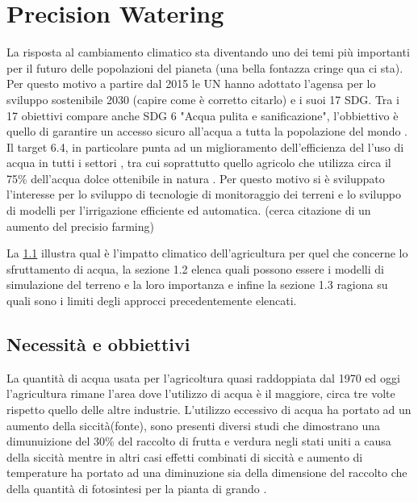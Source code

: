 \documentclass[12pt,a4paper,openright,twoside]{book}
\begin{document}
\chapter{Precision Watering}
%
%
La risposta al cambiamento climatico sta diventando uno dei temi più importanti per il futuro delle popolazioni del pianeta (una bella fontazza cringe qua ci sta). Per questo motivo a partire dal 2015 le \ac{UN} hanno adottato l'agensa per lo sviluppo sostenibile 2030 (capire come è corretto citarlo) e i suoi 17 \ac{SDG}. 
%
Tra i 17 obiettivi compare anche \ac{SDG} 6 "Acqua pulita e sanificazione", l'obbiettivo è quello di garantire un accesso sicuro all'acqua a tutta la popolazione del mondo \cite{SDG-6} . Il target 6.4, in particolare punta ad un miglioramento dell'efficienza del l'uso di acqua in tutti i settori \cite{SDG-6-4-1, UN-Water-Water-use-eff-21} , tra cui soprattutto quello agricolo che utilizza circa il 75\% dell'acqua dolce ottenibile in natura \cite{Wallace2000}. 
%
Per questo motivo si è sviluppato l'interesse per lo sviluppo di tecnologie di monitoraggio dei terreni e lo sviluppo di modelli per l'irrigazione efficiente ed automatica. (cerca citazione di un aumento del precisio farming)

La \cref{necessità e obbiettivi} illustra qual è l'impatto climatico dell'agricultura per quel che concerne lo sfruttamento di acqua, la sezione 1.2 elenca quali possono essere i modelli di simulazione del terreno e la loro importanza e infine la sezione 1.3 ragiona su quali sono i limiti degli approcci precedentemente elencati.

\section{Necessità e obbiettivi}
\label{necessità e obbiettivi}

La quantità di acqua usata per l'agricoltura quasi raddoppiata dal 1970 ed oggi l'agricultura rimane l'area dove l'utilizzo di acqua è il maggiore, circa tre volte rispetto quello delle altre industrie. \cite{FAO-acquastat-2020}
L'utilizzo eccessivo di acqua ha portato ad un aumento della siccità(fonte), sono presenti diversi studi che dimostrano una dimunuizione del 30\% del raccolto di frutta e verdura negli stati uniti a causa della siccità mentre in altri casi effetti combinati di siccità e aumento di temperature ha portato ad una diminuzione sia della dimensione del raccolto che della quantità di fotosintesi per la pianta di grando \cite{Cogato-Meggio-Migliorati-Marinello-2019}.
\end{document}
